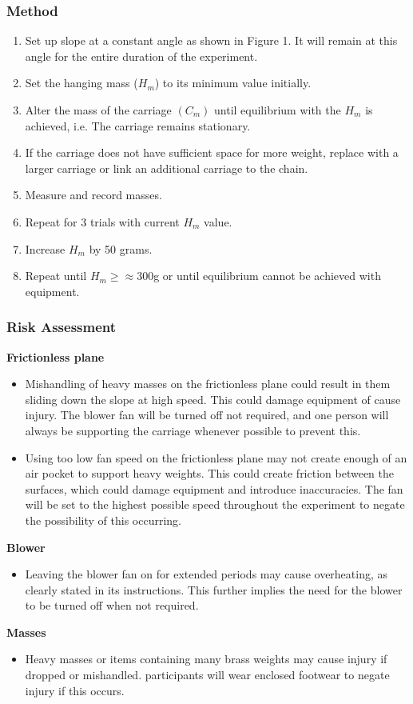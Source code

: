 \documentclass[11pt,a4paper]{article}
\begin{document}
\subsubsection{Method}
\begin{enumerate}
\item Set up slope at a constant angle as shown in Figure 1. It will remain at this angle for the entire duration of the experiment. 
\item Set the hanging mass ($H_m$) to its minimum value initially.
\item Alter the mass of the carriage $(C_m)$ until equilibrium with the $H_m$ is achieved, i.e. The carriage remains stationary. 
\item If the carriage does not have sufficient space for more weight, replace with a larger carriage or link an additional carriage to the chain.  
\item Measure and record masses. 
\item Repeat for 3 trials with current $H_m$ value.
\item Increase $H_m$ by 50 grams. 
\item Repeat until $H_m\geq\approx 300$g or until equilibrium cannot be achieved with equipment.
\end{enumerate}


\subsubsection{Risk Assessment}
\textbf{Frictionless plane}
\begin{itemize}
	\item Mishandling of heavy masses on the frictionless plane could result in them sliding down the slope at high speed. This could damage equipment of cause injury. The blower fan will be turned off not required, and one person will always be supporting the carriage whenever possible to prevent this.
	\item Using too low fan speed on the frictionless plane may not create enough of an air pocket to support heavy weights. This could create friction between the surfaces, which could damage equipment and introduce inaccuracies. The fan will be set to the highest possible speed throughout the experiment to negate the possibility of this occurring.
\end{itemize}
\textbf{Blower}
\begin{itemize}
	\item Leaving the blower fan on for extended periods may cause overheating, as clearly stated in its instructions. This further implies the need for the blower to be turned off when not required.
\end{itemize}
\textbf{Masses}
\begin{itemize}
	\item Heavy masses or items containing many brass weights may cause injury if dropped or mishandled. participants will wear enclosed footwear to negate injury if this occurs.  
\end{itemize}
\end{document}

